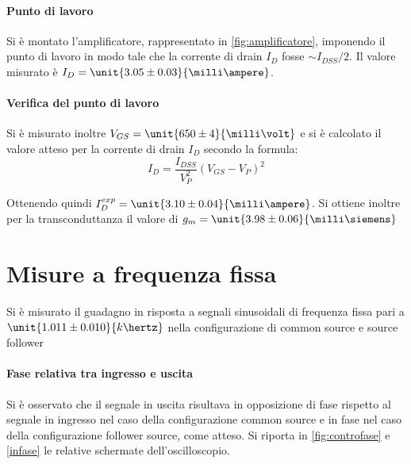 \documentclass[10pt,a4paper]{article}
\begin{document}
\paragraph{Punto di lavoro} Si è montato l'amplificatore, rappresentato in \figurename{\ref{fig:amplificatore}}, imponendo il punto di lavoro in modo tale che la corrente di drain $I_D$ fosse $\sim I_{DSS}/2$. Il valore misurato è $I_D = \unit{3.05 \pm 0.03}{\milli\ampere}$.


\paragraph{Verifica del punto di lavoro} Si è misurato inoltre $V_{GS} = \unit{650 \pm 4}{\milli\volt}$ e si è calcolato il valore atteso per la corrente di drain $I_D$ secondo la formula:
\begin{equation*}
I_D = \frac{I_{DSS}}{V_P^2}(V_{GS} - V_P)^2
\end{equation*}

Ottenendo quindi $I_D^{exp} = \unit{3.10 \pm 0.04}{\milli\ampere}$. Si ottiene inoltre per la transconduttanza il valore di $g_m = \unit{3.98 \pm 0.06}{\milli\siemens}$

\section{Misure a frequenza fissa}

Si è misurato il guadagno in risposta a segnali sinusoidali di frequenza fissa pari a $\unit{1.011 \pm 0.010}{k\hertz}$ nella configurazione di common source e source follower

\paragraph{Fase relativa tra ingresso e uscita} Si è osservato che il segnale in uscita risultava in opposizione di fase rispetto al segnale in ingresso nel caso della configurazione common source e in fase nel caso della configurazione follower source, come atteso. Si riporta in \figurename{\ref{fig:controfase}} e \figurename{\ref{infase}} le relative schermate dell'oscilloscopio.
\end{document}

